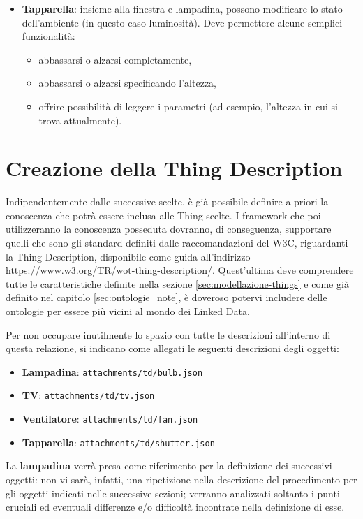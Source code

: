 \documentclass[12pt,a4paper,openright,oneside]{report}
\begin{document}
\begin{itemize}
	\item \textbf{Tapparella}: insieme alla finestra e lampadina, possono modificare lo stato dell'ambiente (in questo caso luminosità). Deve permettere alcune semplici funzionalità:
	\begin{itemize}
		\setlength\itemsep{-0.0em}
		\item abbassarsi o alzarsi completamente,
		\item abbassarsi o alzarsi specificando l'altezza,
		\item offrire possibilità di leggere i parametri (ad esempio, l'altezza in cui si trova attualmente).
	\end{itemize}
\end{itemize}


\section{Creazione della Thing Description}
Indipendentemente dalle successive scelte, è già possibile definire a priori la conoscenza che potrà essere inclusa alle Thing scelte. I framework che poi utilizzeranno la conoscenza posseduta dovranno, di conseguenza, supportare quelli che sono gli standard definiti dalle raccomandazioni del W3C, riguardanti la Thing Description, disponibile come guida all'indirizzo \url{https://www.w3.org/TR/wot-thing-description/}. Quest'ultima deve comprendere tutte le caratteristiche definite nella sezione \ref{sec:modellazione-things} e come già definito nel capitolo \ref{sec:ontologie_note}, è doveroso potervi includere delle ontologie per essere più vicini al mondo dei Linked Data.

Per non occupare inutilmente lo spazio con tutte le descrizioni all'interno di questa relazione, si indicano come allegati le seguenti descrizioni degli oggetti:

\begin{itemize}
	\setlength\itemsep{-0.3em}
	\item \textbf{Lampadina}: \texttt{attachments/td/bulb.json}
	\item \textbf{TV}: \texttt{attachments/td/tv.json}
	\item \textbf{Ventilatore}: \texttt{attachments/td/fan.json}
	\item \textbf{Tapparella}: \texttt{attachments/td/shutter.json}
\end{itemize}

La \textbf{lampadina} verrà presa come riferimento per la definizione dei successivi oggetti: non vi sarà, infatti, una ripetizione nella descrizione del procedimento per gli oggetti indicati nelle successive sezioni; verranno analizzati soltanto i punti cruciali ed eventuali differenze e/o difficoltà incontrate nella definizione di esse.
\end{document}
